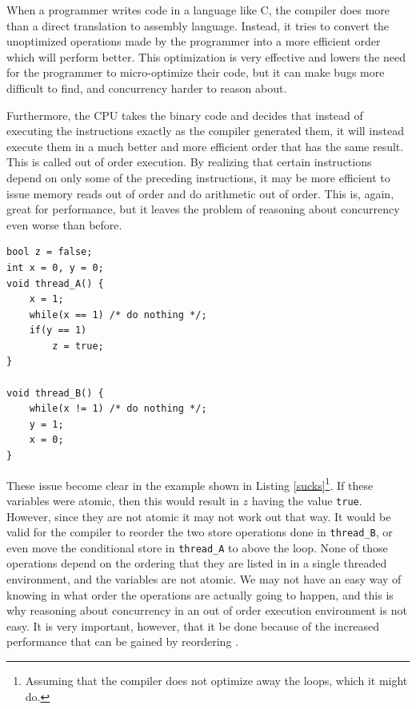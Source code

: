 \documentclass[12pt]{article}
\begin{document}
When a programmer writes code in a language like C, the compiler does more than a direct translation to assembly
language. Instead, it tries to convert the unoptimized operations made by the programmer into a more efficient
order which will perform better. This optimization is very effective and lowers
the need for the programmer to micro-optimize their code, but it can make bugs more difficult to find, and concurrency harder to reason about.

Furthermore, the CPU takes the binary code and decides that instead of executing the instructions
exactly as the compiler generated them, it will instead execute them in a much better and more efficient order that has the same
result. This is called out of order execution. By realizing that certain instructions depend on only some of the preceding
instructions, it may be more efficient to issue memory reads out of order and do arithmetic out of order. This is,
again, great for performance, but it leaves the problem of reasoning about concurrency even worse than before.

\begin{minipage}{\linewidth}
	\onehalfspacing
\begin{lstlisting}[label={sucks},caption={Example of how reordering can affect
	the result of execution.}]
bool z = false;
int x = 0, y = 0;
void thread_A() {
	x = 1;
	while(x == 1) /* do nothing */;
	if(y == 1)
		z = true;
}

void thread_B() {
	while(x != 1) /* do nothing */;
	y = 1;
	x = 0;
}
\end{lstlisting}
	\doublespacing
\end{minipage}
These issue become clear in the example shown in Listing \ref{sucks}\footnote{Assuming that the compiler does not optimize away the loops, which it might do.}.
If these variables were atomic, then this would result in $z$ having the value \texttt{true}.
However, since they are not atomic it may
not work out that way. It would be valid for the compiler to reorder the two store operations done in \texttt{thread\_B},
or even move the conditional store in \texttt{thread\_A} to above the loop. None of those operations depend
on the ordering that they are listed in in a single threaded environment, and the variables are not atomic.
We may not have an easy way of knowing in what order the operations are actually
going to happen, and this is why reasoning about concurrency in an out of order execution environment is not easy.
It is very important, however, that it be done because of the increased performance that can be gained by reordering \cite{atomicweapons}.
\end{document}

